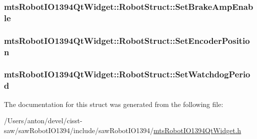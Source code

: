 \subsubsection[{Set\+Brake\+Amp\+Enable}]{ mts\+Robot\+I\+O1394\+Qt\+Widget\+::\+Robot\+Struct\+::\+Set\+Brake\+Amp\+Enable}\label{structmts_robot_i_o1394_qt_widget_1_1_robot_struct_ad417df4f69d6495b513bab95282c5d1c}
\hypertarget{structmts_robot_i_o1394_qt_widget_1_1_robot_struct_a70dc86de257b6f14358323f985f07b8a}{}
\subsubsection[{Set\+Encoder\+Position}]{ mts\+Robot\+I\+O1394\+Qt\+Widget\+::\+Robot\+Struct\+::\+Set\+Encoder\+Position}\label{structmts_robot_i_o1394_qt_widget_1_1_robot_struct_a70dc86de257b6f14358323f985f07b8a}
\hypertarget{structmts_robot_i_o1394_qt_widget_1_1_robot_struct_a596d925a30141dfde20884ed7a778f42}{}
\subsubsection[{Set\+Watchdog\+Period}]{ mts\+Robot\+I\+O1394\+Qt\+Widget\+::\+Robot\+Struct\+::\+Set\+Watchdog\+Period}\label{structmts_robot_i_o1394_qt_widget_1_1_robot_struct_a596d925a30141dfde20884ed7a778f42}


The documentation for this struct was generated from the following file\+:\begin{DoxyCompactItemize}
\item 
/\+Users/anton/devel/cisst-\/saw/saw\+Robot\+I\+O1394/include/saw\+Robot\+I\+O1394/\hyperlink{mts_robot_i_o1394_qt_widget_8h}{mts\+Robot\+I\+O1394\+Qt\+Widget.\+h}\end{DoxyCompactItemize}
